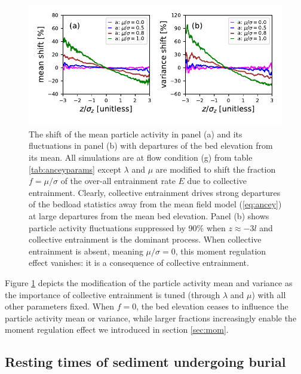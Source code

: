 \documentclass[draft]{agujournal2018}
\begin{document}
\begin{figure}[!ht]
	\includegraphics[width=\linewidth,keepaspectratio]{colent-suppression.pdf}
	\caption{The shift of the mean particle activity in panel (a) and its fluctuations in panel (b) with departures of the bed elevation from its mean. All simulations are at flow condition (g) from table \ref{tab:anceyparams} except $\lambda$ and $\mu$ are modified to shift the fraction $f=\mu/\sigma$ of the over-all entrainment rate $E$ due to collective entrainment. Clearly, collective entrainment drives strong departures of the bedload statistics away from the mean field model (\ref{eq:ancey}) at large departures from the mean bed elevation. Panel (b) shows particle activity fluctuations suppressed by 90\% when $z\approx -3l$ and collective entrainment is the dominant process. When collective entrainment is absent, meaning $\mu/\sigma=0$, this moment regulation effect vanishes: it is a consequence of collective entrainment.}
	\label{fig:colent}
\end{figure}
Figure \ref{fig:colent} depicts the modification of the particle activity mean and variance as the importance of collective entrainment is tuned (through $\lambda$ and $\mu$) with all other parameters fixed. When $f=0$, the bed elevation ceases to influence the particle activity mean or variance, while larger fractions increasingly enable the moment regulation effect we introduced in section \ref{sec:mom}.

\subsection{Resting times of sediment undergoing burial}
\label{sec:rtcdf}
\end{document}
